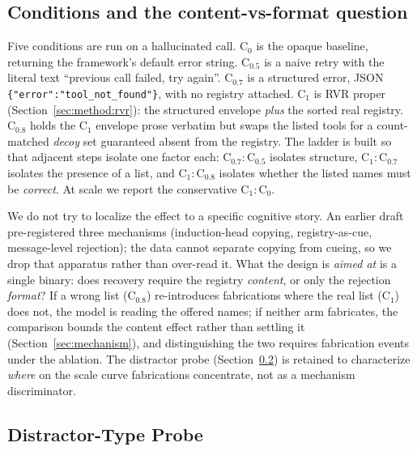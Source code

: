 \subsection{Conditions and the content-vs-format question}
\label{sec:method:conditions}

Five conditions are run on a hallucinated call. \textbf{$\mathrm{C}_0$} is the
opaque baseline, returning the framework's default error string.
\textbf{$\mathrm{C}_{0.5}$} is a naive retry with the literal text ``previous
call failed, try again''. \textbf{$\mathrm{C}_{0.7}$} is a structured error,
JSON \texttt{\{"error":"tool\_not\_found"\}}, with no registry attached.
\textbf{$\mathrm{C}_1$} is RVR proper (Section~\ref{sec:method:rvr}): the
structured envelope \emph{plus} the sorted real registry. \textbf{$\mathrm{C}_{0.8}$}
holds the $\mathrm{C}_1$ envelope prose verbatim but swaps the listed tools for a
count-matched \emph{decoy} set guaranteed absent from the registry. The ladder
is built so that adjacent steps isolate one factor each: $\mathrm{C}_{0.7}\!:\!\mathrm{C}_{0.5}$
isolates structure, $\mathrm{C}_1\!:\!\mathrm{C}_{0.7}$ isolates the presence of a list,
and $\mathrm{C}_1\!:\!\mathrm{C}_{0.8}$ isolates whether the listed names must be
\emph{correct}. At scale we report the conservative $\mathrm{C}_1\!:\!\mathrm{C}_0$.

We do not try to localize the effect to a specific cognitive story. An
earlier draft pre-registered three mechanisms (induction-head copying,
registry-as-cue, message-level rejection); the data cannot separate
copying from cueing, so we drop that apparatus rather than over-read it.
What the design is \emph{aimed at} is a single binary: does recovery
require the registry \emph{content}, or only the rejection \emph{format}?
If a wrong list ($\mathrm{C}_{0.8}$) re-introduces fabrications where the
real list ($\mathrm{C}_1$) does not, the model is reading the offered
names; if neither arm fabricates, the comparison bounds the content
effect rather than settling it (Section~\ref{sec:mechanism}), and
distinguishing the two requires fabrication events under the ablation. The
distractor probe (Section~\ref{sec:method:probe}) is retained to
characterize \emph{where} on the scale curve fabrications concentrate,
not as a mechanism discriminator.

\subsection{Distractor-Type Probe}
\label{sec:method:probe}

